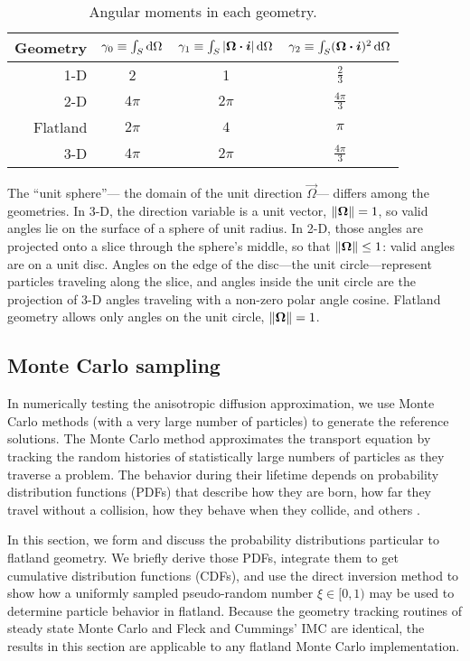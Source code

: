 \begin{table}[htb]
  \centering
  \begin{tabular}{rccc}
\toprule
   Geometry
   & $\gamma_0 \equiv \int_S \mathop{}\!\mathrm{d}\Omega$
   & $\gamma_1 \equiv \int_S \left| \bm{\Omega}\bm{\cdot}\bm{i} \right| \mathop{}\!\mathrm{d}\Omega$
   & $\gamma_2 \equiv \int_S (\bm{\Omega}\bm{\cdot}\bm{i})^2 \mathop{}\!\mathrm{d}\Omega$
\\ \midrule
   1-D & 2 & 1 & $\frac{2}{3}$
   \\
   2-D & $4\pi$ & $2\pi$ & $\frac{4\pi}{3}$
   \\
   Flatland & $2\pi$ & $4$ & $\pi$
   \\
   3-D & $4\pi$ & $2\pi$ & $\frac{4\pi}{3}$
\\ \bottomrule
  \end{tabular}
  \caption{Angular moments in each geometry.}
  \label{tab:angularMoments}
\end{table}

The ``unit sphere''---%
the domain of the unit direction $\vec{\Omega}$---%
differs among the geometries. In 3-D, the direction variable is a unit vector,
$\left\| \bm{\Omega} \right\|=1$, so valid angles
lie on the surface of a sphere of unit radius. In 2-D, those angles are
projected onto a slice through the sphere's middle, so that
$\left\| \bm{\Omega} \right\| \le 1$: valid angles are on a unit disc. Angles on the edge
of the disc---the unit circle---represent particles traveling along the slice,
and angles inside the unit circle are the projection of 3-D angles traveling with a
non-zero polar angle cosine. Flatland geometry allows only angles on the unit
circle, $\left\| \bm{\Omega} \right\|=1$.

\subsection{Monte Carlo sampling}

In numerically testing the anisotropic diffusion approximation, we use Monte
Carlo methods (with a very large number of particles) to generate the reference
solutions.
The Monte Carlo method approximates the transport equation by tracking the
random histories of statistically large numbers of particles as they traverse a
problem. The behavior during their lifetime depends on probability distribution
functions (PDFs) that describe how they are born, how far they travel without a
collision, how they behave when they collide, and others
\cite{Lew1984,Bro2004a}.

In this section, we form and discuss the probability distributions particular to
flatland geometry. We briefly derive those PDFs,
integrate them to get cumulative distribution functions
(CDFs), and use the direct inversion method to show how a uniformly sampled
pseudo-random number $\xi \in [0,1)$ may be used to determine particle behavior
in flatland. Because the geometry tracking routines of steady state Monte Carlo
and Fleck and Cummings' IMC are identical, the results in this section are
applicable to any flatland Monte Carlo implementation.

